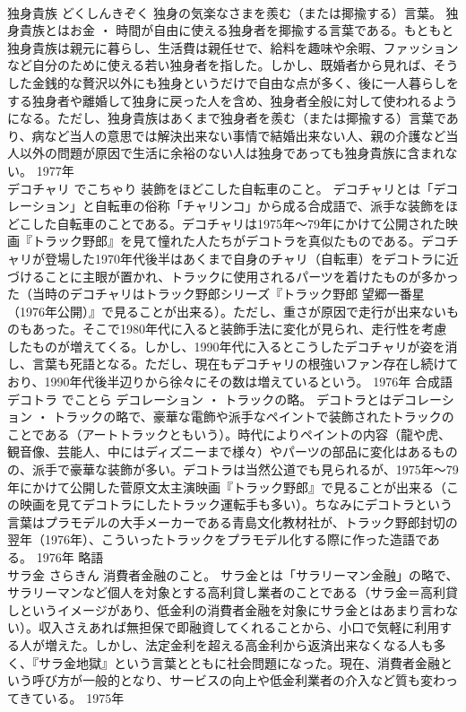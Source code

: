 \documentclass[8pt]{extreport}
\begin{document}
\begin{CJK}{UTF8}{min}
\\	独身貴族	どくしんきぞく	独身の気楽なさまを羨む（または揶揄する）言葉。	独身貴族とはお金 ・ 時間が自由に使える独身者を揶揄する言葉である。もともと独身貴族は親元に暮らし、生活費は親任せで、給料を趣味や余暇、ファッションなど自分のために使える若い独身者を指した。しかし、既婚者から見れば、そうした金銭的な贅沢以外にも独身というだけで自由な点が多く、後に一人暮らしをする独身者や離婚して独身に戻った人を含め、独身者全般に対して使われるようになる。ただし、独身貴族はあくまで独身者を羨む（または揶揄する）言葉であり、病など当人の意思では解決出来ない事情で結婚出来ない人、親の介護など当人以外の問題が原因で生活に余裕のない人は独身であっても独身貴族に含まれない。	1977年	
\\	デコチャリ	でこちゃり	装飾をほどこした自転車のこと。	デコチャリとは「デコレーション」と自転車の俗称「チャリンコ」から成る合成語で、派手な装飾をほどこした自転車のことである。デコチャリは1975年～79年にかけて公開された映画『トラック野郎』を見て憧れた人たちがデコトラを真似たものである。デコチャリが登場した1970年代後半はあくまで自身のチャリ（自転車）をデコトラに近づけることに主眼が置かれ、トラックに使用されるパーツを着けたものが多かった（当時のデコチャリはトラック野郎シリーズ『トラック野郎 望郷一番星（1976年公開）』で見ることが出来る）。ただし、重さが原因で走行が出来ないものもあった。そこで1980年代に入ると装飾手法に変化が見られ、走行性を考慮したものが増えてくる。しかし、1990年代に入るとこうしたデコチャリが姿を消し、言葉も死語となる。ただし、現在もデコチャリの根強いファン存在し続けており、1990年代後半辺りから徐々にその数は増えているという。	1976年	合成語	
\\	デコトラ	でことら	デコレーション ・ トラックの略。	デコトラとはデコレーション ・ トラックの略で、豪華な電飾や派手なペイントで装飾されたトラックのことである（アートトラックともいう）。時代によりペイントの内容（龍や虎、観音像、芸能人、中にはディズニーまで様々）やパーツの部品に変化はあるものの、派手で豪華な装飾が多い。デコトラは当然公道でも見られるが、1975年～79年にかけて公開した菅原文太主演映画『トラック野郎』で見ることが出来る（この映画を見てデコトラにしたトラック運転手も多い）。ちなみにデコトラという言葉はプラモデルの大手メーカーである青島文化教材社が、トラック野郎封切の翌年（1976年）、こういったトラックをプラモデル化する際に作った造語である。	1976年	略語	
\\	サラ金	さらきん	消費者金融のこと。	サラ金とは「サラリーマン金融」の略で、サラリーマンなど個人を対象とする高利貸し業者のことである（サラ金＝高利貸しというイメージがあり、低金利の消費者金融を対象にサラ金とはあまり言わない）。収入さえあれば無担保で即融資してくれることから、小口で気軽に利用する人が増えた。しかし、法定金利を超える高金利から返済出来なくなる人も多く、『サラ金地獄』という言葉とともに社会問題になった。現在、消費者金融という呼び方が一般的となり、サービスの向上や低金利業者の介入など質も変わってきている。	1975年	

\end{CJK}
\end{document}
